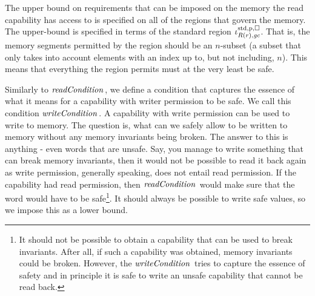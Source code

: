 \begin{jversion}
The upper bound on requirements that can be imposed on the memory the read capability has access to is specified on all of the regions that govern the memory.
The upper-bound is specified in terms of the standard region $\iota^{\mathrm{std},\mathrm{p},\square}_{R(r),\mathit{gc}}$.
That is, the memory segments permitted by the region should be an $n$-subset (a subset that only takes into account elements with an index up to, but not including, $n$).
This means that everything the region permits must at the very least be safe.


Similarly to $\readCond[]{}$, we define a condition that captures the essence of what it means for a capability with writer permission to be safe.
We call this condition $\writeCond[]{}$.
A capability with write permission can be used to write to memory.
The question is, what can we safely allow to be written to memory without any memory invariants being broken.
The answer to this is anything - even words that are unsafe.
Say, you manage to write something that can break memory invariants, then it would not be possible to read it back again as write permission, generally speaking, does not entail read permission.
If the capability had read permission, then $\readCond[]{}$ would make sure that the word would have to be safe\footnote{It should not be possible to obtain a capability that can be used to break invariants. After all, if such a capability was obtained, memory invariants could be broken.
  However, the $\writeCond[]{}$ tries to capture the essence of safety and in principle it is safe to write an unsafe capability that cannot be read back.}.
It should always be possible to write safe values, so we impose this as a lower bound.


\end{jversion}
